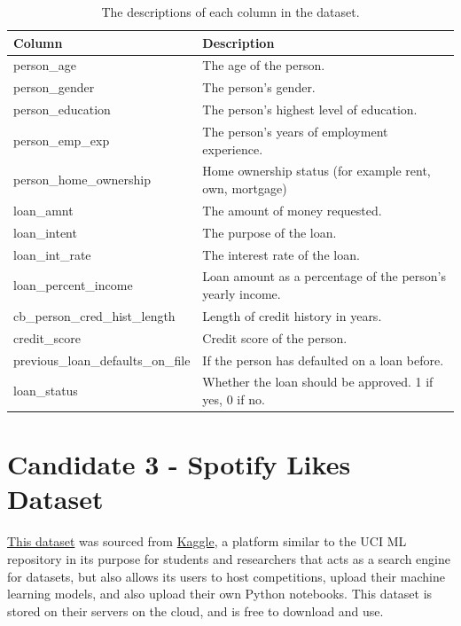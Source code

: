\documentclass[12pt]{report}
\begin{document}
\begin{table}[H]
    \centering
        \begin{tabular}{ |p{}| p{}|}
            \hline
            \cellcolor{blue!25}Column & \cellcolor{blue!25}Description\\
            \hline
            person\_age & The age of the person.\\
            \hline
            person\_gender & The person's gender.\\
            \hline
            person\_education & The person's highest level of education.\\
            \hline
            person\_emp\_exp & The person's years of employment experience.\\
            \hline
            person\_home\_ownership & Home ownership status (for example rent, own, mortgage)\\
            \hline
            loan\_amnt & The amount of money requested.\\
            \hline
            loan\_intent & The purpose of the loan.\\
            \hline
            loan\_int\_rate & The interest rate of the loan.\\
            \hline
            loan\_percent\_income & Loan amount as a percentage of the person's yearly income.\\
            \hline
            cb\_person\_cred\_hist\_length & Length of credit history in years.\\
            \hline
            credit\_score & Credit score of the person.\\
            \hline
            previous\_loan\_defaults\_on\_file & If the person has defaulted on a loan before. \\
            \hline
            loan\_status & Whether the loan should be approved. 1 if yes, 0 if no.\\
            \hline
    \end{tabular}
    \caption{The descriptions of each column in the dataset.}\label{tab:Loan-Types}
\end{table}



\pagebreak

\section{Candidate 3 - Spotify Likes Dataset}
\href{https://www.kaggle.com/datasets/bricevergnou/spotify-recommendation/data}{This dataset} was sourced from \href{https://www.kaggle.com/datasets}{Kaggle}, a platform similar to the UCI ML repository in its purpose for students and researchers
that acts as a search engine for datasets, but also allows its users to host competitions, upload their machine learning models, and also upload 
their own Python notebooks. This dataset is stored on their servers on the cloud, and is free to download and use.
\end{document}
